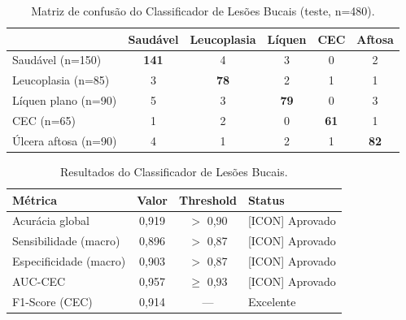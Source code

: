 \begin{table}[H]
  \centering
  \caption{Matriz de confusão do Classificador de Lesões Bucais (teste, n=480).}
  \label{tab:lesion-confusion}
  \begin{tabularx}{\textwidth}{lccccc}
    \toprule
    & \textbf{Saudável} & \textbf{Leucoplasia} & \textbf{Líquen} & \textbf{CEC} & \textbf{Aftosa} \\
    \midrule
    Saudável (n=150) & \textbf{141} & 4 & 3 & 0 & 2 \\
    Leucoplasia (n=85) & 3 & \textbf{78} & 2 & 1 & 1 \\
    Líquen plano (n=90) & 5 & 3 & \textbf{79} & 0 & 3 \\
    CEC (n=65) & 1 & 2 & 0 & \textbf{61} & 1 \\
    Úlcera aftosa (n=90) & 4 & 1 & 2 & 1 & \textbf{82} \\
    \bottomrule
  \end{tabularx}
\end{table}

\begin{table}[H]
  \centering
  \caption{Resultados do Classificador de Lesões Bucais.}
  \label{tab:lesion-results}
  \begin{tabularx}{\textwidth}{lccX}
    \toprule
    \textbf{Métrica} & \textbf{Valor} & \textbf{Threshold} & \textbf{Status} \\
    \midrule
    Acurácia global & 0,919 & $>$ 0,90 & \textcolor{corTesteSucesso}{[ICON] Aprovado} \\
    Sensibilidade (macro) & 0,896 & $>$ 0,87 & \textcolor{corTesteSucesso}{[ICON] Aprovado} \\
    Especificidade (macro) & 0,903 & $>$ 0,87 & \textcolor{corTesteSucesso}{[ICON] Aprovado} \\
    AUC-CEC & 0,957 & $\geq$ 0,93 & \textcolor{corTesteSucesso}{[ICON] Aprovado} \\
    F1-Score (CEC) & 0,914 & — & Excelente \\
    \bottomrule
  \end{tabularx}
\end{table}



